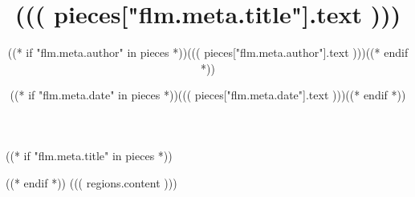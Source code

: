 \documentclass{article}
\begin{document}
((* if "flm.meta.title" in pieces *))
\title{((( pieces["flm.meta.title"].text )))}
\author{((* if "flm.meta.author" in pieces *))((( pieces["flm.meta.author"].text )))((* endif *))}
\date{((* if "flm.meta.date" in pieces *))((( pieces["flm.meta.date"].text )))((* endif *))}
\maketitle
((* endif *))
((( regions.content )))
\end{document}
